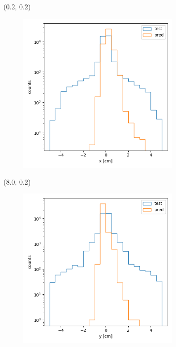 \documentclass[12pt, xcolor={dvipsnames}, aspectratio = 169]{beamer}
\begin{document}
\begin{frame}

\begin{textblock}{8.0}(0.2, 0.2)
    \begin{figure}
        \centering
        \includegraphics[width=8.0cm]{../imgs/cls-vtx.png}
    \end{figure}
\end{textblock}

\begin{textblock}{8.0}(8.0, 0.2)
    \begin{figure}
        \centering
        \includegraphics[width=8.0cm]{../imgs/cls-vty.png}
    \end{figure}
\end{textblock}

\end{frame}
\end{document}
